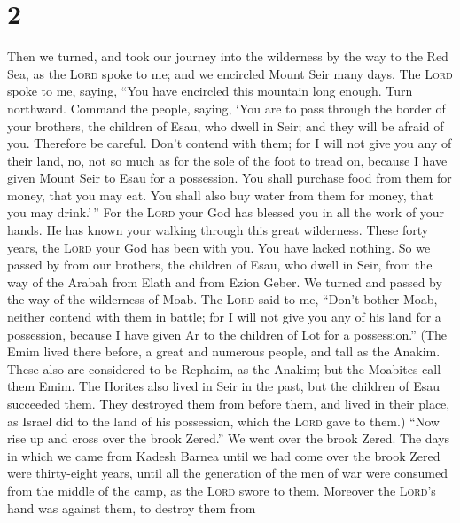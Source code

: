 \hypertarget{section-1}{%
\section{2}\label{section-1}}

 Then we turned, and took our journey into the wilderness
by the way to the Red Sea, as the \textsc{Lord} spoke to me; and we
encircled Mount Seir many days.  The \textsc{Lord} spoke
to me, saying,  ``You have encircled this mountain long
enough. Turn northward.  Command the people, saying, `You
are to pass through the border of your brothers, the children of Esau,
who dwell in Seir; and they will be afraid of you. Therefore be careful.
 Don't contend with them; for I will not give you any of
their land, no, not so much as for the sole of the foot to tread on,
because I have given Mount Seir to Esau for a possession. 
You shall purchase food from them for money, that you may eat. You shall
also buy water from them for money, that you may drink.'\,''
 For the \textsc{Lord} your God has blessed you in all the
work of your hands. He has known your walking through this great
wilderness. These forty years, the \textsc{Lord} your God has been with
you. You have lacked nothing.  So we passed by from our
brothers, the children of Esau, who dwell in Seir, from the way of the
Arabah from Elath and from Ezion Geber. We turned and passed by the way
of the wilderness of Moab.  The \textsc{Lord} said to me,
``Don't bother Moab, neither contend with them in battle; for I will not
give you any of his land for a possession, because I have given Ar to
the children of Lot for a possession.''  (The Emim lived
there before, a great and numerous people, and tall as the Anakim.
 These also are considered to be Rephaim, as the Anakim;
but the Moabites call them Emim.  The Horites also lived
in Seir in the past, but the children of Esau succeeded them. They
destroyed them from before them, and lived in their place, as Israel did
to the land of his possession, which the \textsc{Lord} gave to them.)
 ``Now rise up and cross over the brook Zered.'' We went
over the brook Zered.  The days in which we came from
Kadesh Barnea until we had come over the brook Zered were thirty-eight
years, until all the generation of the men of war were consumed from the
middle of the camp, as the \textsc{Lord} swore to them. 
Moreover the \textsc{Lord}'s hand was against them, to destroy them from
